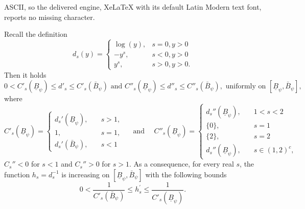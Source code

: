 \documentclass[10pt,a4paper]{amsart}
\begin{document}
ASCII, so the delivered engine, XeLaTeX with its default Latin Modern text font, reports no missing character.
\begin{lemma}\label{lemma:prop_d_alpha_1}
Recall the definition
$$
d_s(y)= \begin{cases}\log (y), & s=0, y>0 \\ -y^s, & s<0, y > 0  \\ y^s, & s>0, y > 0.\end{cases}
$$
Then it holds
$$
0< C'_{s}(\underline{B}_{\psi}) \leq d'_{s} \leq C'_{s}(\bar{B}_{\psi}) \text{ and } C''_{s}(\underline{B}_{\psi}) \leq d''_{s} \leq C''_{s}(\bar{B}_{\psi}), \text{ uniformly on }[\underline{B}_{\psi}, \bar{B}_{\psi}],
$$
where 
\begin{equation}\label{def:C'_s}
C'_{s}(\underline{B}_{\psi})=
\begin{cases}
    d_{s}'(\underline{B}_{\psi}), \quad &s >1,\\
    1, \quad &s =1,\\
    d_{s}'(\bar{B}_{\psi}), \quad &s <1
\end{cases}
\quad \text{ and } \quad 
C''_{s}(\underline{B}_{\psi}) = 
\begin{cases}
    d_{s}''(\underline{B}_{\psi}),\quad & 1< s < 2\\
    \{0\},\quad & s = 1\\
    \{2\},\quad & s = 2\\
    d_{s}''(\underline{B}_{\psi}),\quad & s \in (1,2)^c,
\end{cases}
\end{equation}
$C_s''< 0$ for $s<1$ and $C_s''>0$ for $s> 1$. As a consequence, for every real $s$, the function $h_{s} = d_{s}^{-1}$ is increasing on $[\underline{B}_{\psi}, \bar{B}_{\psi}]$ with the following bounds
$$
0<\frac{1}{C'_{s}(\bar{B}_{\psi})}\leq h_{s}^{\prime} \leq \frac{1}{C'_{s}(\underline{B}_{\psi})}.
$$
\end{lemma}
\end{document}
